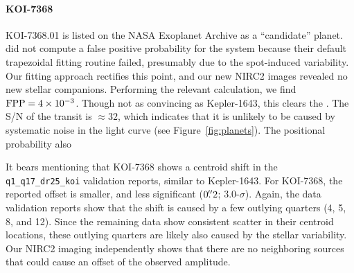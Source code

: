 \documentclass[12pt,twocolumn,tighten,linenumbers]{aastex63}
\begin{document}
\paragraph{KOI-7368}
KOI-7368.01 is listed on the NASA Exoplanet Archive as a ``candidate''
planet.  \citet{morton_false_2016} did not compute a false positive
probability for the system because their default trapezoidal fitting
routine failed, presumably due to the spot-induced variability.  Our
fitting approach rectifies this point, and our new NIRC2 images
revealed no new stellar companions.  Performing the relevant
calculation, we find ${\rm FPP} = 4\times10^{-3}$.  Though not
as convincing as Kepler-1643, this clears the .  The S/N of the transit is
$\approx$$32$, which indicates that it is unlikely to be caused by
systematic noise in the light curve (see Figure~\ref{fig:planets}).
The positional probability also 

It bears mentioning that KOI-7368 shows a centroid shift in the
\texttt{q1\_q17\_dr25\_koi} validation reports, similar to
Kepler-1643.  For KOI-7368, the reported offset is smaller, and less
significant ($0\mbox{$.\!\!^{\prime\prime}$}2$; 3.0-$\sigma$).  Again, the
data validation reports show that the shift is caused by a few
outlying quarters (4, 5, 8, and 12).  Since the remaining data show
consistent scatter in their centroid locations, these outlying
quarters are likely also caused by the stellar variability.
Our NIRC2 imaging independently shows that there are no neighboring sources that could cause an offset of the observed
amplitude.
\end{document}
